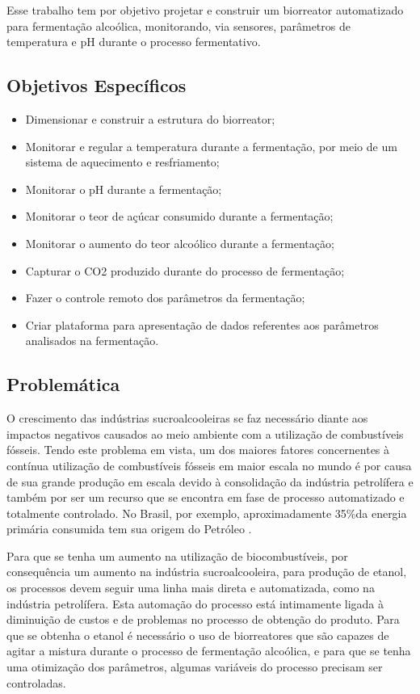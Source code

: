 Esse trabalho tem por objetivo projetar e construir um biorreator automatizado para fermentação alcoólica, monitorando, via sensores, parâmetros de temperatura e pH durante o processo fermentativo.

\subsection{Objetivos Específicos}

\begin{itemize}
	\item Dimensionar e construir a estrutura do biorreator;
	\item Monitorar e regular a temperatura durante a fermentação, por meio de um sistema de aquecimento e resfriamento;
	\item Monitorar o pH durante a fermentação;
	\item Monitorar o teor de açúcar consumido durante a fermentação;
	\item Monitorar o aumento do teor alcoólico durante a fermentação;
	\item Capturar o CO2 produzido durante do processo de fermentação;
	\item Fazer o controle remoto dos parâmetros da fermentação;
	\item Criar plataforma para apresentação de dados referentes aos parâmetros analisados na fermentação.
\end{itemize}

\subsection{Problemática}

O crescimento das indústrias sucroalcooleiras se faz necessário diante aos impactos negativos causados ao meio ambiente com a utilização de combustíveis fósseis. Tendo este problema em vista, um dos maiores fatores concernentes à contínua utilização de combustíveis fósseis em maior escala no mundo é por causa de sua grande produção em escala devido à consolidação da indústria petrolífera e também por ser um recurso que se encontra em fase de processo automatizado e totalmente controlado. No Brasil, por exemplo, aproximadamente 35\%da energia primária consumida tem sua origem do Petróleo \cite{lucchesi1998petroleo}.

Para que se tenha um aumento na utilização de biocombustíveis, por consequência um aumento na indústria sucroalcooleira, para produção de etanol, os processos devem seguir uma linha mais direta e automatizada, como na indústria petrolífera. Esta automação do processo está intimamente ligada à diminuição de custos e de problemas no processo de obtenção do produto. Para que se obtenha o etanol é necessário o uso de biorreatores que são capazes de agitar a mistura durante o processo de fermentação alcoólica, e para que se tenha uma otimização dos parâmetros, algumas variáveis do processo precisam ser controladas.

